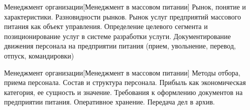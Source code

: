 \documentclass[
	11pt,
	a4paper,
	]
	{article}
\begin{document}
\vfill



\begin{minipage}[t][\miniH]{\miniL}\centering
	 {Менеджмент организации}[Менеджмент в массовом питании]
		{
			Рынок, понятие и характеристики. Разновидности рынков. Рынок услуг предприятий массового питания как объект управления.
		}{
			Определение целевого сегмента и позиционирование услуг в системе разработки услуги.
		}{
			Документирование движения персонала на предприятии питания (прием, увольнение, перевод, отпуск, командировки)
		}
	\lowGE
\end{minipage}





\begin{minipage}[t][\miniH]{\miniL}\centering
	 {Менеджмент организации}[Менеджмент в массовом питании]
		{
			Методы отбора, приема персонала. Состав и структура персонала.
		}{
			Прибыль как экономическая категория, ее сущность и значение.
		}{
			Требования к оформлению документов на предприятии питания. Оперативное хранение. Передача дел в архив.
		}
	\lowGE
\end{minipage}

\vfill

	
\end{document}
